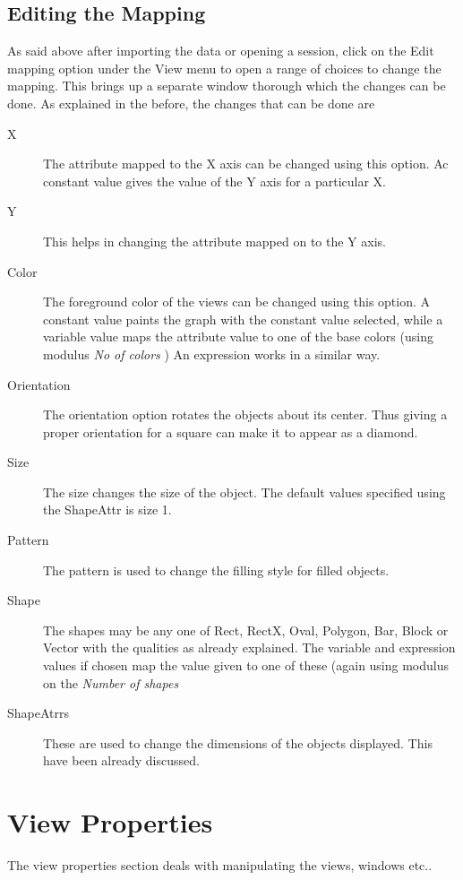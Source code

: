 \subsection{Editing the Mapping}

As said above after importing the data or opening a session, click on the Edit mapping option under the View menu to open a range of choices to change the mapping. This brings up a separate window thorough which the changes can be done. As explained in the before, the changes that can be done are

\begin{description}
\item[X] The attribute mapped to the X axis can be changed using this option. Ac constant value gives the value of the Y axis for a particular X. 
\item[Y] This helps in changing the attribute mapped on to the Y axis.
\item[Color] The foreground color of the views can be changed using this option. A constant value paints the graph with the constant value selected, while a variable value maps the attribute value to one of the base colors (using modulus  {\em No of colors }) An expression works in a similar way.
\item[Orientation] The orientation option rotates the objects about its center. Thus giving a proper orientation for a square can  make it to appear as a  diamond.
\item[Size] The size changes the size of the object. The default values specified using the ShapeAttr is size 1.
\item[Pattern] The pattern is used to change the filling style for filled objects.
\item[Shape] The shapes may be any one of Rect, RectX, Oval, Polygon, Bar, Block or Vector with the qualities as already explained. The variable and expression values if chosen map the value given to one of these (again using modulus on the {\em Number of shapes } 
\item[ShapeAtrrs] These are used to change the dimensions of the objects displayed. This have been already discussed. 
\end{description}

\section{View Properties}

The view properties section deals with manipulating the views, windows etc..

